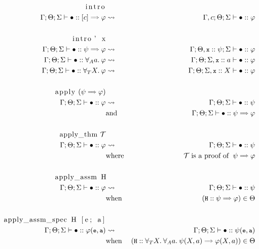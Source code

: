 \documentclass[english, mgr]{iithesis}
\renewcommand{\tt}[1]{\texttt{\small{#1}}}
\begin{document}
\begin{eqnarray*}
  \text{\lstinline[columns=fixed]{intro}} & & \\
    \jgmnt[\Gamma; \Theta; \Sigma]{\hole\ofkind{\fCImp{\constr}{\formphi}}} & \leadsto & \jgmnt[\Gamma, \constr; \Theta; \Sigma]{\hole\ofkind\formphi} \\
  & & \\
  \text{\lstinline[columns=fixed]{intro' x}} & & \\
  \jgmnt[\Gamma; \Theta; \Sigma]{\hole\ofkind{\psi\fImp\formphi}} & \leadsto & \jgmnt[\Gamma; \Theta, \tt{x} \ofkind\psi ; \Sigma]{\hole\ofkind\formphi} \\
  \jgmnt[\Gamma; \Theta; \Sigma]{\hole\ofkind{\fForallAtom{\atomv}{\formphi}}} & \leadsto & \jgmnt[\Gamma; \Theta; \Sigma, \tt{x} \ofkind\atomv]{\hole\ofkind\formphi} \\
  \jgmnt[\Gamma; \Theta; \Sigma]{\hole\ofkind{\fForallTerm{\termv}{\formphi}}} & \leadsto & \jgmnt[\Gamma; \Theta; \Sigma, \tt{x} \ofkind\termv]{\hole\ofkind\formphi} \\
  & & \\
  \text{\lstinline[columns=fixed]{apply} } (\psi \fImp \formphi)& & \\
  \jgmnt[\Gamma; \Theta; \Sigma]{\hole\ofkind{{\formphi}}} & \leadsto & \jgmnt[\Gamma; \Theta; \Sigma]{\hole\ofkind\psi} \\
  &   \text{and} & \jgmnt[\Gamma; \Theta; \Sigma]{\hole\ofkind\psi \fImp \formphi} \\
  & & \\
  \text{\lstinline[columns=fixed]{apply_thm} }  \mathcal{T} & & \\
    \jgmnt[\Gamma; \Theta; \Sigma]{\hole\ofkind{{\formphi}}} & \leadsto & \jgmnt[\Gamma; \Theta; \Sigma]{\hole\ofkind\psi} \\
   & \text{where} & \mathcal{T} \;\text{is a proof of }\; {\psi \fImp \formphi } \\
  & & \\
  \text{\lstinline[columns=fixed]{apply_assm H}} & & \\
    \jgmnt[\Gamma; \Theta; \Sigma]{\hole\ofkind{{\formphi}}} & \leadsto & \jgmnt[\Gamma; \Theta; \Sigma]{\hole\ofkind\psi} \\
   & \text{when} & (\tt{H} \ofkind {\psi\fImp\formphi }) \in \Theta \\
  & & \\
  \text{\lstinline[columns=fixed]{apply_assm_spec H [e; a]}} & & \\
    \jgmnt[\Gamma; \Theta; \Sigma]{\hole\ofkind{{\formphi(\tt{e}, \tt{a})}}} & \leadsto & \jgmnt[\Gamma; \Theta; \Sigma]{\hole\ofkind\psi(\tt{e}, \tt{a})} \\
   & \text{when} & (\tt{H} \ofkind {\kForallTerm{X}\kForallAtom{a} \psi(X, a)\fImp\formphi(X, a) }) \in \Theta
  \end{eqnarray*}
\end{document}
